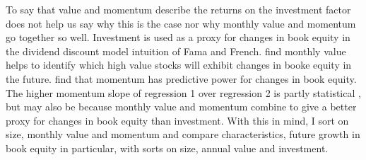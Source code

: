 To say that value and momentum describe the returns on the investment factor
does not help us say why this is the case nor why monthly value and momentum
go together so well.
Investment is used as a proxy for changes in book equity in the dividend
discount model intuition of Fama and French.
\textcite{kok2017facts} find monthly value helps to identify which high value
stocks will exhibit changes in booke equity in the future.
\textcite{asness2013devil} find that momentum has predictive power for changes
in book equity.
The higher momentum slope of regression 1 over regression 2 is partly
statistical \parencite{fama2015incremental}, but may also be because monthly
value and momentum combine to give a better proxy for changes in book equity
than investment.
With this in mind, I sort on size, monthly value and momentum and compare
characteristics, future growth in book equity in particular, with sorts on
size, annual value and investment.


